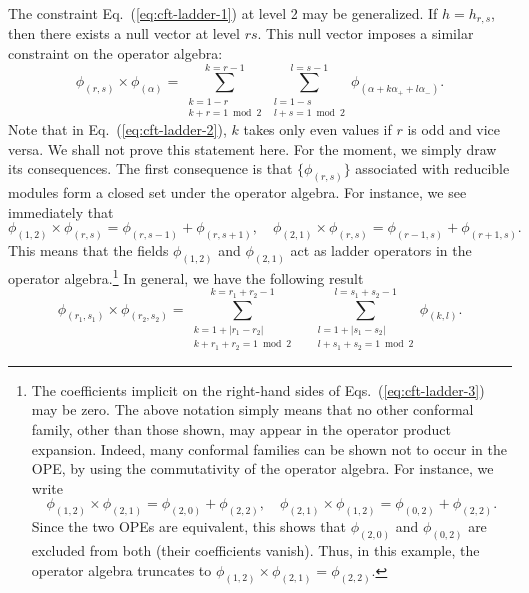 \documentclass[aps,prb,superscriptaddress,nofootinbib]{revtex4}
\begin{document}
The constraint Eq.~(\ref{eq:cft-ladder-1}) at level 2 may be generalized. 
If $h=h_{r, s}$, then there exists a null vector at level $r s$. 
This null vector imposes a similar constraint on the operator algebra:
\begin{equation}\label{eq:cft-ladder-2}
	\phi_{(r, s)} \times \phi_{(\alpha)}=\sum_{\substack{k=1-r \\ k+r=1 \bmod 2}}^{k=r-1} \sum_{\substack{l=1-s \\ l+s=1 \bmod 2}}^{l=s-1} \phi_{\left(\alpha+k \alpha_{+}+l \alpha_{-}\right)}.
\end{equation}
Note that in Eq.~(\ref{eq:cft-ladder-2}), $k$ takes only even values if $r$ is odd and vice versa. 
We shall not prove this statement here. 
For the moment, we simply draw its consequences.
The first consequence is that $\{\phi_{(r, s)}\}$ associated with reducible modules form a closed set under the operator algebra. 
For instance, we see immediately that
\begin{equation}\label{eq:cft-ladder-3}
	\phi_{(1,2)} \times \phi_{(r, s)}=\phi_{(r, s-1)}+\phi_{(r, s+1)}, \quad
	\phi_{(2,1)} \times \phi_{(r, s)}=\phi_{(r-1, s)}+\phi_{(r+1, s)}.
\end{equation}
This means that the fields $\phi_{(1,2)}$ and $\phi_{(2,1)}$ act as ladder operators in the operator algebra.\footnote{The coefficients implicit on the right-hand sides of Eqs.~(\ref{eq:cft-ladder-3}) may be zero.
The above notation simply means that no other conformal family, other than those shown, may appear in the operator product expansion.
Indeed, many conformal families can be shown not to occur in the OPE, by using the commutativity of the operator algebra. For instance, we write 
\begin{equation*}
	\phi_{(1,2)} \times \phi_{(2,1)}=\phi_{(2,0)}+\phi_{(2,2)},\quad
	\phi_{(2,1)} \times \phi_{(1,2)}=\phi_{(0,2)}+\phi_{(2,2)}.
\end{equation*}
Since the two OPEs are equivalent, this shows that $\phi_{(2,0)}$ and $\phi_{(0,2)}$ are excluded from both (their coefficients vanish). 
Thus, in this example, the operator algebra truncates to $\phi_{(1,2)} \times \phi_{(2,1)}=\phi_{(2,2)}$.}
In general, we have the following result
\begin{equation}\label{eq:cft-ladder-4}
	\phi_{(r_1, s_1)} \times \phi_{(r_2, s_2)}
	=\sum_{\substack{k=1+|r_1-r_2| \\ k+r_1+r_2=1 \bmod 2}}^{k=r_1+r_2-1} \quad \sum_{\substack{l=1+|s_1-s_2| \\ l+s_1+s_2=1 \bmod 2}}^{l=s_1+s_2-1} \phi_{(k, l)}.
\end{equation}
\end{document}
